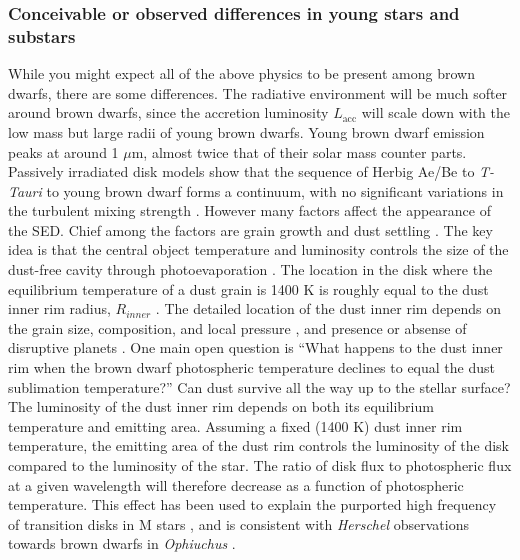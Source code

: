 \documentclass[12pt,preprint]{aastex}
\begin{document}
\subsubsection{Conceivable or observed differences in young stars and substars}
While you might expect all of the above physics to be present among brown dwarfs, there are some differences.  The radiative environment will be much softer around brown dwarfs, since the accretion luminosity $L_{\mathrm{acc}}$ will scale down with the low mass but large radii of young brown dwarfs.  Young brown dwarf emission peaks at around 1 $\mu$m, almost twice that of their solar mass counter parts.  Passively irradiated disk models \citep{2003A&A...398..607D} show that the sequence of Herbig Ae/Be to \emph{T-Tauri} to young brown dwarf forms a continuum, with no significant variations in the turbulent mixing strength \citep{2012A&A...539A...9M}. However many factors affect the appearance of the SED.  Chief among the factors are grain growth and dust settling \citep{2010ApJ...712..925C}.  The key idea is that the central object temperature and luminosity controls the size of the dust-free cavity through photoevaporation \citep{2011ARA&A..49...67W}.  The location in the disk where the equilibrium temperature of a dust grain is 1400 K is roughly equal to the dust inner rim radius, $R_{inner}$ \citep{2001ApJ...560..957D}.  The detailed location of the dust inner rim depends on the grain size, composition, and local pressure \citep{2005A&A...438..899I}, and presence or absense of disruptive planets \citep{2014prpl.conf..667B, 2015arXiv150302649P}.  One main open question is ``What happens to the dust inner rim when the brown dwarf photospheric temperature declines to equal the dust sublimation temperature?''  Can dust survive all the way up to the stellar surface?  The luminosity of the dust inner rim depends on both its equilibrium temperature and emitting area.  Assuming a fixed (1400 K) dust inner rim temperature, the emitting area of the dust rim controls the luminosity of the disk compared to the luminosity of the star.  The ratio of disk flux to photospheric flux at a given wavelength will therefore decrease as a function of photospheric temperature.  This effect has been used to explain the purported high frequency of transition disks in M stars \citep{2009MNRAS.394L.141E}, and is consistent with \emph{Herschel} observations towards brown dwarfs in \emph{Ophiuchus} \citep{2013A&A...559A.126A}.
\end{document}
